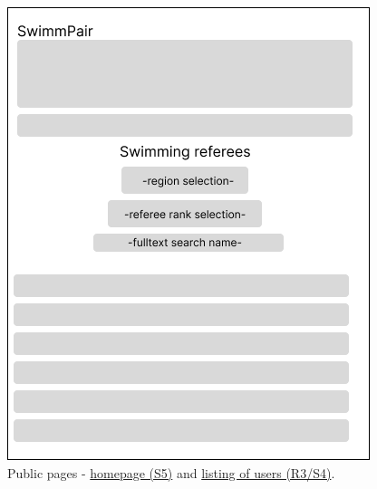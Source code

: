 \begin{figure}[h]
    \includegraphics[scale=0.457]{img/def-U-ListingUsers.png}
	\caption{Public pages - \underline{homepage (S5)} and \underline{listing of users (R3/S4)}.}
	\label{fig2.2:fepublicpages1}
\end{figure}
